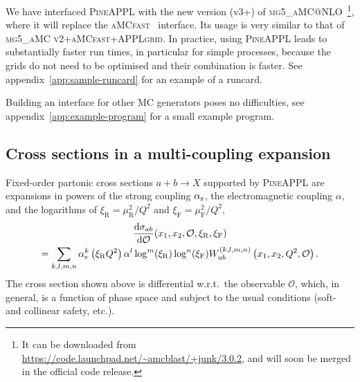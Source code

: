 We have interfaced \textsc{PineAPPL} with the new version (v3+) of \textsc{mg5\_aMC@NLO}~\cite{Alwall:2014hca,Frederix:2018nkq}\footnote{It can be downloaded from \url{https://code.launchpad.net/~amcblast/+junk/3.0.2}, and will soon be merged in the official code release.}, where it will replace the \textsc{aMCfast}~\cite{Bertone:2014zva} interface.
Its usage is very similar to that of \textsc{mg5\_aMC v2}+\textsc{aMCfast}+\textsc{APPLgrid}.
In practice, using \textsc{PineAPPL} leads to substantially faster run times, in particular for simple processes, because the grids do not need to be optimised 
and their combination is faster.
See appendix~\ref{app:sample-runcard} for an example of a runcard.

Building an interface for other MC generators poses no difficulties, see appendix~\ref{app:example-program} for a small example program.

\subsection{Cross sections in a multi-coupling expansion}
\label{sec:multi-coupling-expansion}

Fixed-order partonic cross sections $a + b \to X$ supported by \textsc{PineAPPL} are expansions in powers of the strong coupling $\alpha_\mathrm{s}$, the electromagnetic coupling $\alpha$, and the logarithms of $\xi_\mathrm{R} = \mu_\mathrm{R}^2 / Q^2$ and $\xi_\mathrm{F} = \mu_\mathrm{F}^2 / Q^2$,
\begin{multline}
\frac{\mathrm{d} \sigma_{ab}}{\mathrm{d} \mathcal{O}} (x_1, x_2, \mathcal{O}, \xi_\mathrm{R}, \xi_\mathrm{F}) \\
= \sum_{k,l,m,n} \alpha_\mathrm{s}^k \left( \xi_\mathrm{R} Q^2 \right) \alpha^l \log^m ( \xi_\mathrm{R} ) \log^n ( \xi_\mathrm{F} ) W_{ab}^{(k,l,m,n)} \left( x_1, x_2, Q^2, \mathcal{O} \right) \text{.}
\label{eq:expansion}
\end{multline}
The cross section shown above is differential w.r.t.\ the observable $\mathcal{O}$, which, in general, is a function of phase space and subject to the usual conditions (soft- and collinear safety, etc.).

